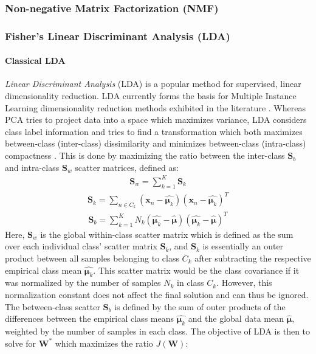 \subsubsection{Non-negative Matrix Factorization (NMF)}

\subsubsection{Fisher's Linear Discriminant Analysis (LDA)} \label{sec:LDA}

\paragraph{Classical LDA}
\textit{Linear Discriminant Analysis} (LDA) is a popular method for supervised, linear dimensionality reduction.  LDA currently forms the basis for Multiple Instance Learning dimensionality reduction methods exhibited in the literature \citep{Sun2010MIDR,Chai2014MIDA,Zhu2018MIDRSparsity,Xu2011MI_Metric_Learning}. Whereas PCA tries to project data into a space which maximizes variance, LDA considers class label information and tries to find a transformation which both maximizes between-class (inter-class) dissimilarity and minimizes between-class (intra-class) compactness \citep{Yan2007GeneralGraphEmbeddingFramework,Chao2019RecentAdvancesSupervisedDimRed, Sun2010MIDR, Murphy2012}.   This is done by maximizing the ratio between the inter-class $\bm{S}_{b}$ and intra-class $\bm{S}_{w}$ scatter matrices, defined as:
\begin{align}
	\bm{S}_{w} = \sum_{k=1}^{K}\bm{S}_{k}
\end{align}
\begin{align}
	\bm{S}_{k} = \sum_{n \in C_{k}}(\bm{x}_{n} - \hat{\bm{\mu}_{k}})(\bm{x}_{n} - \hat{\bm{\mu}_{k}})^{T}
\end{align}
\begin{align}
	\bm{S}_{b} = \sum_{k=1}^{K}N_{k}(\hat{\bm{\mu}_{k}} - \hat{\bm{\mu}})(\hat{\bm{\mu}_{k}} - \hat{\bm{\mu}})^{T}
\end{align}
\noindent
Here, $\bm{S}_{w}$ is the global within-class scatter matrix which is defined as the sum over each individual class' scatter matrix $\bm{S}_{k}$, and $\bm{S}_{k}$ is essentially an outer product between all samples belonging to class $C_{k}$ after subtracting the respective empirical class mean $\hat{\bm{\mu}_{k}}$.  This scatter matrix would be the class covariance if it was normalized by the number of samples $N_{k}$ in class $C_{k}$.  However, this normalization constant does not affect the final solution and can thus be ignored.  The between-class scatter $\bm{S}_{b}$ is defined by the sum of outer products of the differences between the empirical class means $\hat{\bm{\mu}_{k}}$ and the global data mean $\hat{\bm{\mu}}$, weighted by the number of samples in each class.  The objective of LDA is then to solve for $\bm{W}^{*}$ which maximizes the ratio $J(\bm{W})$:
